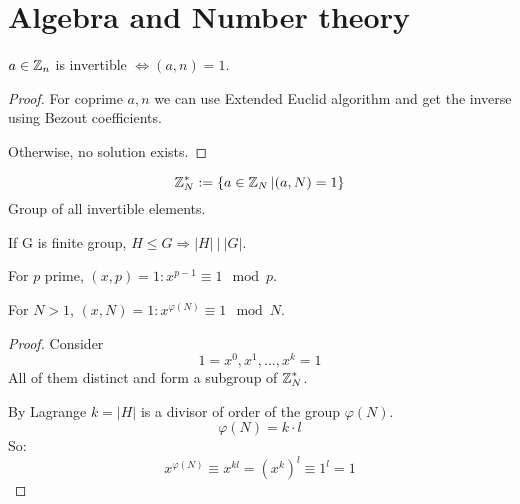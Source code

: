 \section{\texorpdfstring{Algebra and Number theory}{Algebra and Number theory}}
\vspace{5mm}
\large

\begin{theorem}
	$a \in \operatorname{\mathbb{Z}}_n$ is invertible $\iff (a, n) = 1$.
\end{theorem}
\begin{proof}
	For coprime $a, n$ we can use Extended Euclid algorithm and get the inverse using Bezout coefficients.

	Otherwise, no solution exists.
\end{proof}

\begin{definition}
	\[ \operatorname{\mathbb{Z}}_N^{\ast} := \{ a \in \operatorname{\mathbb{Z}}_N | (a, N) = 1 \} \]
	Group of all invertible elements.
\end{definition}

\begin{theorem}[Lagrange]
	If G is finite group, $H \leq G \Rightarrow |H|\ |\ |G|$.
\end{theorem}

\begin{theorem}
	For $p$ prime, $(x, p) = 1: x^{p-1} \equiv 1\mod p $.
\end{theorem}

\begin{theorem}[Euler]
	For $N > 1$, $(x, N) = 1: x^{\varphi(N)} \equiv 1 \mod N$.
\end{theorem}
\begin{proof}
	Consider
	\[ 1 = x^0, x^1,..., x^k = 1 \]
	All of them distinct and form a subgroup of $\operatorname{\mathbb{Z}}_N^{\ast}$.

	By Lagrange $k = |H|$ is a divisor of order of the group $\varphi(N)$.
	\[ \varphi(N) = k\cdot l\]
	So:
	\[ x^{\varphi(N)} \equiv x^{kl} = (x^k)^l \equiv 1^l = 1\]

\end{proof}

